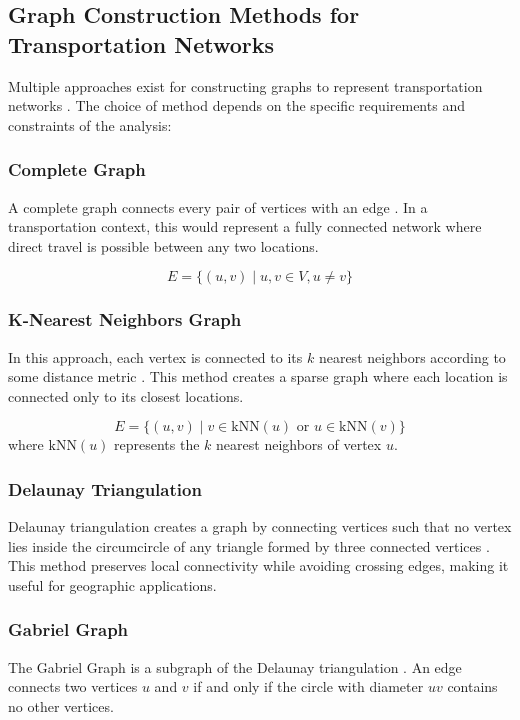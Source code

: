 \subsection{Graph Construction Methods for Transportation Networks}
\label{subsec:GraphConstructionMethods}

Multiple approaches exist for constructing graphs to represent transportation networks \cite{barthélemy2011spatial}. The choice of method depends on the specific requirements and constraints of the analysis:

\subsubsection{Complete Graph}
A complete graph connects every pair of vertices with an edge \cite{west2001introduction}. In a transportation context, this would represent a fully connected network where direct travel is possible between any two locations.

\begin{equation}
    E = \{(u, v) \mid u, v \in V, u \neq v\}
\end{equation}

\subsubsection{K-Nearest Neighbors Graph}
In this approach, each vertex is connected to its $k$ nearest neighbors according to some distance metric \cite{luxburg2007tutorial}. This method creates a sparse graph where each location is connected only to its closest locations.

\begin{equation}
    E = \{(u, v) \mid v \in \text{kNN}(u) \text{ or } u \in \text{kNN}(v)\}
\end{equation}
where $\text{kNN}(u)$ represents the $k$ nearest neighbors of vertex $u$.

\subsubsection{Delaunay Triangulation}
Delaunay triangulation creates a graph by connecting vertices such that no vertex lies inside the circumcircle of any triangle formed by three connected vertices \cite{berg2008computational}. This method preserves local connectivity while avoiding crossing edges, making it useful for geographic applications.

\subsubsection{Gabriel Graph}
The Gabriel Graph is a subgraph of the Delaunay triangulation \cite{gabriel1969new}. An edge connects two vertices $u$ and $v$ if and only if the circle with diameter $uv$ contains no other vertices.

